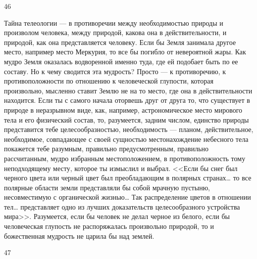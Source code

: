 \documentclass[12pt]{article}
\begin{document}
46

Тайна телеологии --- в противоречии между необходимостью природы и произволом человека, между природой, какова она в действительности, и природой, как она представляется человеку. Если бы Земля занимала другое место, например место Меркурия, то все бы погибло от невероятной жары. Как мудро Земля оказалась водворенной именно туда, где ей подобает быть по ее составу. Но к чему сводится эта мудрость? Просто --- к противоречию, к противоположности по отношению к человеческой глупости, которая произвольно, мысленно ставит Землю не на то место, где она в действительности находится. Если ты с самого начала оторвешь друг от друга то, что существует в природе в неразрывном виде, как, например, астрономическое место мирового тела и его физический состав, то, разумеется, задним числом, единство природы представится тебе целесообразностью, необходимость --- планом, действительное, необходимое, совпадающее с своей сущностью местонахождение небесного тела покажется тебе разумным, правильно предусмотренным, правильно рассчитанным, мудро избранным местоположением, в противоположность тому неподходящему месту, которое ты измыслил и выбрал. <<Если бы снег был черного цвета или черный цвет был преобладающим в полярных странах… то все полярные области земли представляли бы собой мрачную пустыню, несовместимую с органической жизнью… Так распределение цветов в отношении тел… представляет одно из лучших доказательств целесообразного устройства мира>>. Разумеется, если бы человек не делал черное из белого, если бы человеческая глупость не распоряжалась произвольно природой, то и божественная мудрость не царила бы над землей.



47
\end{document}
